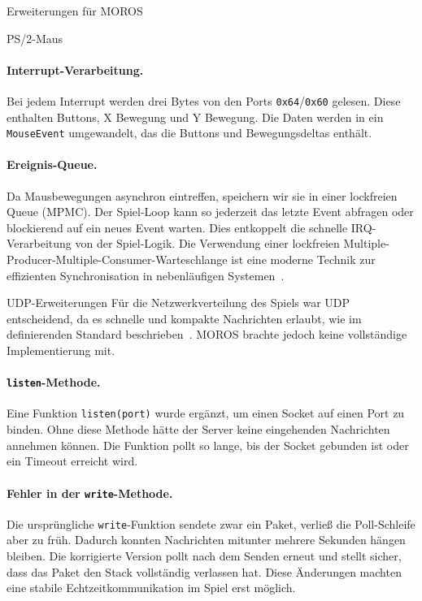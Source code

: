 \begin{section}{Erweiterungen für MOROS}
\begin{subsection}{PS/2-Maus}
\paragraph{Interrupt-Verarbeitung.}
Bei jedem Interrupt werden drei Bytes von den Ports \texttt{0x64}/\texttt{0x60} gelesen.
Diese enthalten Buttons, X Bewegung und Y Bewegung.
Die Daten werden in ein \texttt{MouseEvent} umgewandelt, das die Buttons und Bewegungsdeltas enthält.
\paragraph{Ereignis-Queue.}
Da Mausbewegungen asynchron eintreffen, speichern wir sie in einer lockfreien Queue (MPMC).
Der Spiel-Loop kann so jederzeit das letzte Event abfragen oder blockierend auf ein neues Event warten.
Dies entkoppelt die schnelle IRQ-Verarbeitung von der Spiel-Logik. Die Verwendung einer lockfreien Multiple-Producer-Multiple-Consumer-Warteschlange ist eine moderne Technik zur effizienten Synchronisation in nebenläufigen Systemen~\cite{nikolaev2019scalable}.

\end{subsection}

\begin{subsection}{UDP-Erweiterungen}
Für die Netzwerkverteilung des Spiels war UDP entscheidend, da es schnelle und kompakte Nachrichten erlaubt, wie im definierenden Standard beschrieben~\cite{rfc768}.
MOROS brachte jedoch keine vollständige Implementierung mit.

\paragraph{\texttt{listen}-Methode.}
Eine Funktion \texttt{listen(port)} wurde ergänzt, um einen Socket auf einen Port zu binden.
Ohne diese Methode hätte der Server keine eingehenden Nachrichten annehmen können.
Die Funktion pollt so lange, bis der Socket gebunden ist oder ein Timeout erreicht wird.
\paragraph{Fehler in der \texttt{write}-Methode.}
Die ursprüngliche \texttt{write}-Funktion sendete zwar ein Paket, verließ die Poll-Schleife aber zu früh.
Dadurch konnten Nachrichten mitunter mehrere Sekunden hängen bleiben.
Die korrigierte Version pollt nach dem Senden erneut und stellt sicher, dass das Paket den Stack vollständig verlassen hat.
Diese Änderungen machten eine stabile Echtzeitkommunikation im Spiel erst möglich.


\end{subsection}
\end{section}
